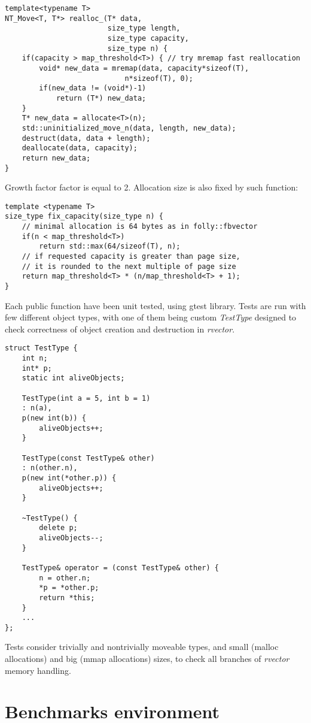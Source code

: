\documentclass[inz, english, shortabstract]{iithesis}
\begin{document}
\begin{lstlisting}[caption=rvector nontrivial type reallocation]
template<typename T>
NT_Move<T, T*> realloc_(T* data, 
						size_type length, 
						size_type capacity, 
						size_type n) {
    if(capacity > map_threshold<T>) { // try mremap fast reallocation
        void* new_data = mremap(data, capacity*sizeof(T), 
                    		n*sizeof(T), 0);
        if(new_data != (void*)-1)
        	return (T*) new_data;
    }
    T* new_data = allocate<T>(n);
    std::uninitialized_move_n(data, length, new_data);
    destruct(data, data + length);
    deallocate(data, capacity);
    return new_data;
}
\end{lstlisting}
Growth factor factor is equal to 2. Allocation size is also fixed by such function: 

\begin{lstlisting}[caption=fix capacity]
template <typename T>
size_type fix_capacity(size_type n) {
	// minimal allocation is 64 bytes as in folly::fbvector
	if(n < map_threshold<T>)
        return std::max(64/sizeof(T), n);
    // if requested capacity is greater than page size,
    // it is rounded to the next multiple of page size
    return map_threshold<T> * (n/map_threshold<T> + 1);
}
\end{lstlisting}
Each public function have been unit tested, using gtest library\cite{rvector_tests}. Tests are run with few different object types, with one of them being custom {\it TestType} designed to check correctness of object creation and destruction in {\it rvector}.

\begin{lstlisting}[caption=TestType]
struct TestType {
	int n;
	int* p;
	static int aliveObjects;

	TestType(int a = 5, int b = 1)
	: n(a),
	p(new int(b)) {
		aliveObjects++;
	}

	TestType(const TestType& other)
	: n(other.n),
	p(new int(*other.p)) {
		aliveObjects++;
	}

	~TestType() {
		delete p;
		aliveObjects--;
	}

	TestType& operator = (const TestType& other) {
		n = other.n;
		*p = *other.p;
		return *this;
	}
	...
};
\end{lstlisting}
Tests consider trivially and nontrivially moveable types, and small (malloc allocations) and big (mmap allocations) sizes, to check all branches of {\it rvector} memory handling.

\chapter{Benchmarks environment}
\end{document}
